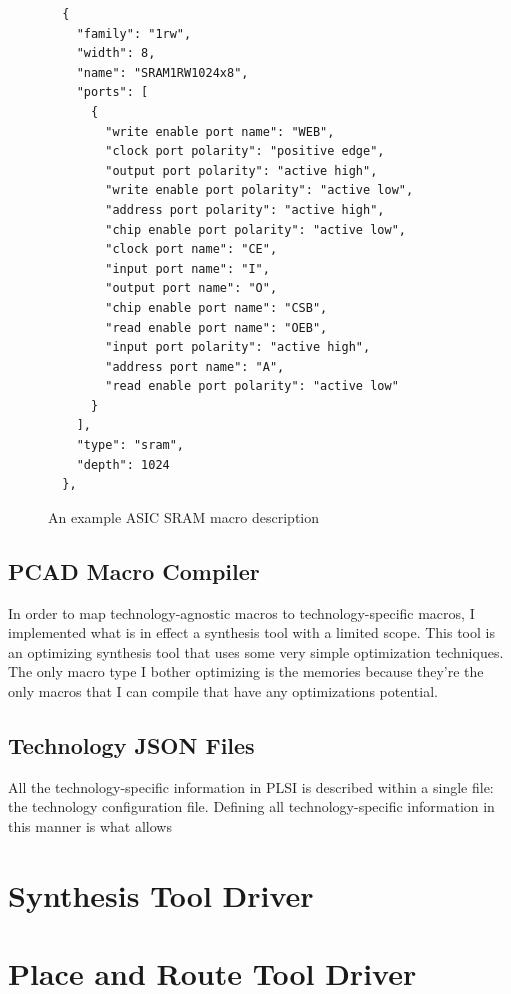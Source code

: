 \documentclass{article}
\begin{document}
\begin{figure}
\begin{verbatim}
  {
    "family": "1rw",
    "width": 8,
    "name": "SRAM1RW1024x8",
    "ports": [
      {
        "write enable port name": "WEB",
        "clock port polarity": "positive edge",
        "output port polarity": "active high",
        "write enable port polarity": "active low",
        "address port polarity": "active high",
        "chip enable port polarity": "active low",
        "clock port name": "CE",
        "input port name": "I",
        "output port name": "O",
        "chip enable port name": "CSB",
        "read enable port name": "OEB",
        "input port polarity": "active high",
        "address port name": "A",
        "read enable port polarity": "active low"
      }
    ],
    "type": "sram",
    "depth": 1024
  },
\end{verbatim}
  \caption{An example ASIC SRAM macro description}
  \label{impl:tech-macro-list}
\end{figure}

\subsection{PCAD Macro Compiler}

In order to map technology-agnostic macros to technology-specific macros, I
implemented what is in effect a synthesis tool with a limited scope.  This tool
is an optimizing synthesis tool that uses some very simple optimization
techniques.  The only macro type I bother optimizing is the memories because
they're the only macros that I can compile that have any optimizations
potential.

\subsection{Technology JSON Files}

All the technology-specific information in PLSI is described within a single
file: the technology configuration file.  Defining all technology-specific
information in this manner is what allows 

\section{Synthesis Tool Driver}

\section{Place and Route Tool Driver}
\end{document}
